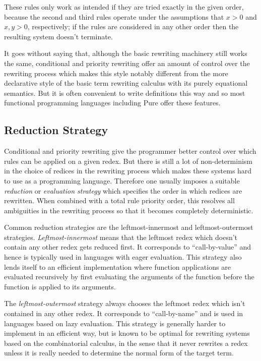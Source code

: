 \documentclass[a4paper,12pt]{article}
\begin{document}
These rules only work as intended if they are tried exactly in the given order, because the second and third rules operate under the assumptions that $x>0$ and $x,y>0$, respectively; if the rules are considered in any other order then the resulting system doesn't terminate.

It goes without saying that, although the basic rewriting machinery still works the same, conditional and priority rewriting offer an amount of control over the rewriting process which makes this style notably different from the more declarative style of the basic term rewriting calculus with its purely equational semantics. But it is often convenient to write definitions this way and so most functional programming languages including Pure offer these features.

\subsection{Reduction Strategy}

Conditional and priority rewriting give the programmer better control over which rules can be applied on a given redex. But there is still a lot of non-determinism in the choice of redices in the rewriting process which makes these systems hard to use as a programming language. Therefore one usually imposes a suitable \emph{reduction} or \emph{evaluation strategy} which specifies the order in which redices are rewritten. When combined with a total rule priority order, this resolves all ambiguities in the rewriting process so that it becomes completely deterministic.

Common reduction strategies are the leftmost-innermost and leftmost-outermost strategies. \emph{Leftmost-innermost} means that the leftmost redex which doesn't contain any other redex gets reduced first. It corresponds to ``call-by-value'' and hence is typically used in languages with eager evaluation. This strategy also lends itself to an efficient implementation where function applications are evaluated recursively by first evaluating the arguments of the function before the function is applied to its arguments.

The \emph{leftmost-outermost} strategy always chooses the leftmost redex which isn't contained in any other redex. It corresponds to ``call-by-name'' and is used in languages based on lazy evaluation. This strategy is generally harder to implement in an efficient way, but is known to be optimal for rewriting systems based on the combinatorial calculus, in the sense that it never rewrites a redex unless it is really needed to determine the normal form of the target term.
\end{document}
